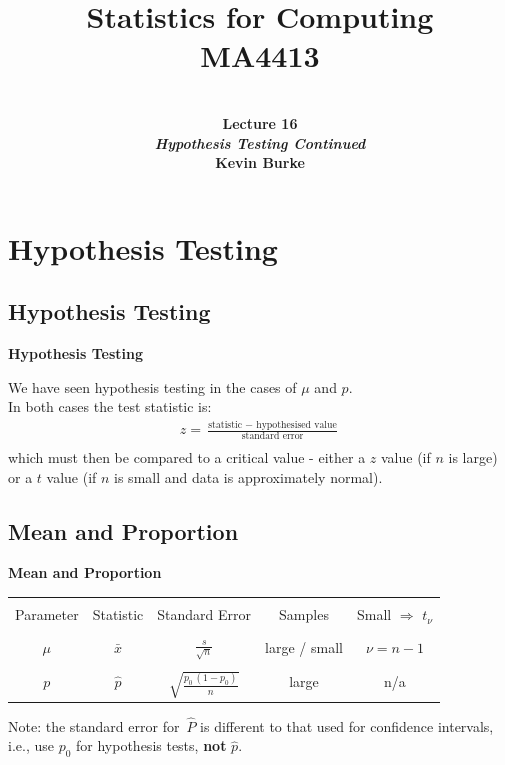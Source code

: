 \documentclass[compress]{beamer}        %
\title{{\huge Statistics for Computing\\[0.1cm]MA4413}}
\author[Kevin Burke]{{\bf\\[0.5cm]{\huge Lecture 16}\\[0.2cm]\emph{Hypothesis Testing Continued}\\[1.4cm]Kevin Burke}\\[0.3cm]\tcb{kevin.burke@ul.ie}}
\institute[University of Limerick, Maths \& Stats Dept]{}
\date{}
\makeatletter
\newcommand{\tcb}{\textcolor{beamer@blendedblue}}
\makeatother
\begin{document}
\begin{frame}[t]
\titlepage
\end{frame}


\section{Hypothesis Testing}
\subsection{Hypothesis Testing}
\begin{frame}{\bf \tcb{Hypothesis Testing}}


We have seen hypothesis testing in the cases of $\mu$ and $p$.\\[1cm]

In both cases the test statistic is:\\
\begin{align*}
z = \frac{\text{statistic }-\text{ hypothesised value}}{\text{standard error}}\\
\end{align*}
which must then be compared to a critical value - either a $z$ value (if $n$ is large) or a $t$ value (if $n$ is small and data is approximately normal).


\end{frame}


\subsection{Mean and Proportion}
\begin{frame}{\bf \tcb{Mean and Proportion}}

\begin{tabular}{|c|c|c|c|c|}
\hline
&&&&\\[-0.1cm]
Parameter & Statistic & Standard Error & Samples & Small $\Rightarrow$ $t_\nu$ \\[0.3cm]
\hline
&&&&\\[-0.1cm]
$\mu$ & $\bar x$ & ${\displaystyle\frac{s}{\sqrt{n}}}$  & large / small & $\nu = n - 1$ \\[0.5cm]
\hline
&&&&\\[-0.1cm]
$p$ & $\hat p$ & \multirow{2}{*}{${\displaystyle\sqrt{\frac{p_0\,(1- p_0)}{n}}}$} & large & n/a \\[0.7cm]
\hline
\multicolumn{5}{c}{}\\[0.5cm]
\end{tabular}

Note: the standard error for $\,\widehat{\!P}$  is different to that used for confidence intervals, i.e., use $p_0$ for hypothesis tests, {\bf not} $\hat p$.


\end{frame}
\end{document}
